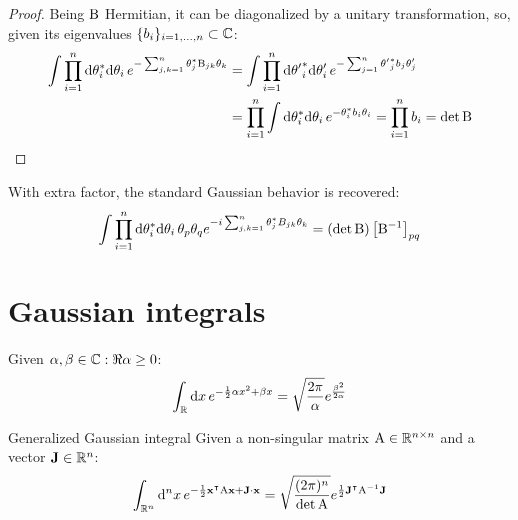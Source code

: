 \begin{proofbox}
  \begin{proof}
    Being $ \mathrm{B} $ Hermitian, it can be diagonalized by a unitary transformation, so, given its eigenvalues $ \{b_i\}_{i = 1,\dots,n} \subset \mathbb{C} $:
    \begin{equation*}
      \begin{split}
        \int \prod_{i = 1}^n \mathrm{d} \theta_i^* \mathrm{d} \theta_i\, e^{- \sum_{j,k = 1}^n \theta_j^* \mathrm{B}_{jk} \theta_k}
        & = \int \prod_{i = 1}^n \mathrm{d} {\theta'}^*_i \mathrm{d} \theta'_i\, e^{- \sum_{j = 1}^n {\theta'}^*_j b_j \theta'_j} \\
        & = \prod_{i = 1}^n \int \mathrm{d} \theta_i^* \mathrm{d} \theta_i\, e^{- \theta_i^* b_i \theta_i} = \prod_{i = 1}^n b_i = \det \mathrm{B}
      \end{split}
    \end{equation*}
  \end{proof}
\end{proofbox}

With extra factor, the standard Gaussian behavior is recovered:
\begin{equation}
  \int \prod_{i = 1}^n \mathrm{d} \theta_i^* \mathrm{d} \theta_i\, \theta_p \theta_q e^{-i \sum_{j,k = 1}^n \theta_j^* B_{jk} \theta_k} = \left( \det \mathrm{B} \right) \left[ \mathrm{B}^{-1} \right]_{pq}
\end{equation}






















\section{Gaussian integrals}

\begin{lemma}{}{}
  Given $ \alpha , \beta \in \mathbb{C} : \Re{\alpha} \ge 0 $:
  \begin{equation}
    \int_{\mathbb{R}} \mathrm{d} x\, e^{-\frac{1}{2} \alpha x^2 + \beta x} = \sqrt{\frac{2\pi}{\alpha}} e^{\frac{\beta^2}{2\alpha}}
    \label{eq:gauss-int}
  \end{equation}
\end{lemma}

\begin{proposition}{Generalized Gaussian integral}{}
  Given a non-singular matrix $ \mathrm{A} \in \mathbb{R}^{n \times n} $ and a vector $ \mathbf{J} \in \mathbb{R}^n $:
  \begin{equation}
    \int_{\mathbb{R}^n} \mathrm{d}^nx\, e^{-\frac{1}{2} \mathbf{x}^\intercal \mathrm{A} \mathbf{x} + \mathbf{J} \cdot \mathbf{x}} = \sqrt{\frac{(2\pi)^n}{\det\mathrm{A}}} e^{\frac{1}{2} \mathbf{J}^\intercal \mathrm{A}^{-1} \mathbf{J}}
  \end{equation}
\end{proposition}

